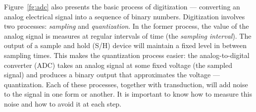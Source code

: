 Figure~\ref{fg:adc} also presents the basic process of digitization
--- converting an analog electrical signal into a sequence of binary
numbers.  Digitization involves two processes: \emph{sampling} and
\emph{quantization}.  In the former process, the value of the analog
signal is measures at regular intervals of time (the \emph{sampling
interval}). The output of a sample and hold (S/H) device will
maintain a fixed level in between sampling times. This makes the
quantization process easier: the analog-to-digital converter (ADC)
takes an analog signal at some fixed voltage (the sampled signal) and
produces a binary output that approximates the voltage ---
quantization. Each of these processes, together with transduction, will add noise to the signal in one form or another. It is important to know how to measure this noise and how to avoid it at each step. 

